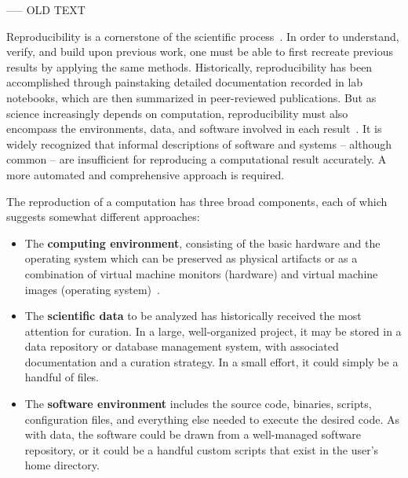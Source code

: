 -----
OLD TEXT

Reproducibility is a cornerstone of the scientific process~\cite{borgman2012data}.
In order to understand, verify, and build upon previous work,
one must be able to first recreate previous results by applying
the same methods. Historically, reproducibility has been
accomplished through painstaking detailed documentation recorded
in lab notebooks, which are then summarized in peer-reviewed publications.
But as science increasingly depends on computation,
reproducibility must also encompass the environments, data, and software
involved in each result~\cite{zabolitzky2002preserving}. It is widely recognized that informal
descriptions of software and systems -- although common -- are insufficient
for reproducing a computational result accurately.
A more automated and comprehensive approach is required.

The reproduction of a computation has three broad components,
each of which suggests somewhat different approaches:

\begin{itemize}
\item The {\bf computing environment}, consisting of the basic hardware and the operating system which can be preserved as physical artifacts or as a combination of virtual machine monitors (hardware) and virtual machine images (operating system)~\cite{matthews2009towards}.
\item The {\bf scientific data} to be analyzed has historically received the most attention for curation.  In a large, well-organized project, it may be stored in a  data repository or database management system, with associated documentation and a curation strategy.  In a small effort, it could simply be a handful of files.
\item The {\bf software environment} includes the source code, binaries, scripts, configuration files, and everything else needed to execute the desired code.  As with data, the software could be drawn from a well-managed software repository, or it could be a handful custom scripts that exist in the user's home directory.
\end{itemize}

